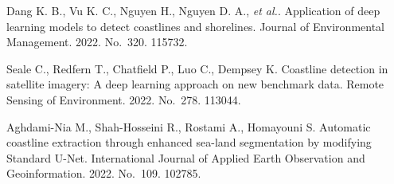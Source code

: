 \begin{thebibliography}{9} %
 Dang K. B., Vu K. C., Nguyen H., Nguyen D. A., \emph{et al.}. Application of deep learning models to detect coastlines and shorelines.  Journal of Environmental Management. 2022. No.~320. 115732.

 Seale C., Redfern T., Chatfield P., Luo C., Dempsey K. Coastline detection in satellite imagery: A deep learning approach on new benchmark data. Remote Sensing of Environment. 2022. No.~278. 113044.

 Aghdami-Nia M., Shah-Hosseini R., Rostami A., Homayouni S. Automatic coastline extraction through enhanced sea-land segmentation by modifying Standard U-Net. International Journal of Applied Earth Observation and Geoinformation. 2022. No.~109. 102785.
\end{thebibliography}





%

